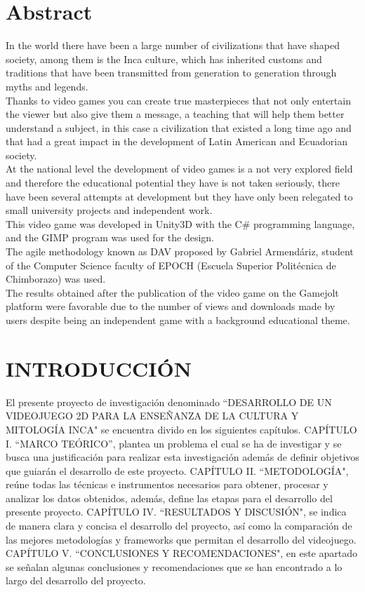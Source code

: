 \documentclass[a4paper, openright, 12pt]{report}
\begin{document}
\chapter*{Abstract}
{}
In the world there have been a large number of civilizations that have shaped society, among them is the Inca culture, which has inherited customs and traditions that have been transmitted from generation to generation through myths and legends.\\
\justify
Thanks to video games you can create true masterpieces that not only entertain the viewer but also give them a message, a teaching that will help them better understand a subject, in this case a civilization that existed a long time ago and that had a great impact in the development of Latin American and Ecuadorian society.\\
\justify
At the national level the development of video games is a not very explored field and therefore the educational potential they have is not taken seriously, there have been several attempts at development but they have only been relegated to small university projects and independent work.\\
\justify
This video game was developed in Unity3D with the C\# programming language, and the GIMP program was used for the design.\\
\justify
The agile methodology known as DAV proposed by Gabriel Armendáriz, student of the Computer Science faculty of EPOCH (Escuela Superior Politécnica de Chimborazo) was used.\\
\justify
The results obtained after the publication of the video game on the Gamejolt platform were favorable due to the number of views and downloads made by users despite being an independent game with a background educational theme.

\newpage
\chapter*{INTRODUCCIÓN}
{}
\justify
El presente proyecto de investigación denominado ``DESARROLLO DE UN VIDEOJUEGO 2D PARA LA ENSEÑANZA DE LA CULTURA Y MITOLOGÍA INCA" se encuentra divido en los siguientes capítulos.
\bigskip
\justify
CAPÍTULO I. ``MARCO TEÓRICO'', plantea un problema el cual se ha de investigar y se busca una justificación para realizar esta investigación además de definir objetivos que guiarán el desarrollo de este proyecto.
\bigskip
\justify
CAPÍTULO II. ``METODOLOGÍA", reúne todas las técnicas e instrumentos necesarios para obtener, procesar y analizar los datos obtenidos, además, define las etapas para el desarrollo del presente proyecto.
\bigskip
\justify
CAPÍTULO IV. ``RESULTADOS Y DISCUSIÓN", se indica de manera clara y concisa el desarrollo del proyecto, así como la comparación de las mejores metodologías y frameworks que permitan el desarrollo del videojuego.
\bigskip
\justify
CAPÍTULO V. ``CONCLUSIONES Y RECOMENDACIONES", en este apartado se señalan algunas conclusiones y recomendaciones que se han encontrado a lo largo del desarrollo del proyecto.
\newpage
\setcounter{page}{1}
\end{document}
